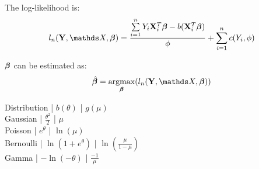 The log-likelihood is:
\begin {equation} \begin {split} 
l_n(\vY, \mX, \vbeta) = \frac { \sum \limits_{i=1}^{n} Y_i \vX_i^T \vbeta -b(\vX_i^T \vbeta) } {\phi}  + \sum \limits_{i=1}^{n} c(Y_i, \phi) \\
\end {split} \end {equation}

$\bm{\beta}$ can be estimated as:
\begin {equation} \begin {split}
& \hat \vbeta = \argmax_{\vbeta} (l_n(\vY, \mX, \vbeta)) \\
\end {split} \end {equation}

 Distribution | $b(\theta)$ | $g(\mu)$ \\
 Gaussian | $ \frac {\theta^2} {2}$ | $ \mu $ \\
 Poisson | $ e^{\theta} $ | $ \ln(\mu) $ \\
 Bernoulli | $ \ln (1 + e^{\theta}) $ | $ \ln (\frac {\mu} {1 - \mu}) $ \\
 Gamma | $ -\ln (-\theta) $ | $ \frac {-1} {\mu} $ \\

